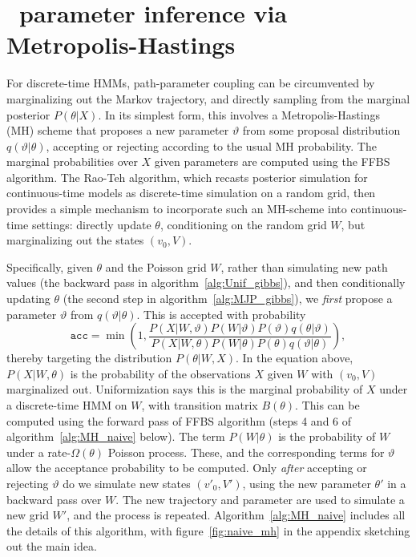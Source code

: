 \vspace{-.2in}
\section{\Naive\ parameter inference via Metropolis-Hastings}
For discrete-time HMMs, path-parameter coupling can be circumvented by marginalizing out the Markov trajectory, and directly sampling from the marginal posterior $P(\theta|X)$.
In its simplest form, this involves a Metropolis-Hastings (MH) scheme that proposes a new parameter $\vartheta$ from some proposal distribution $q(\vartheta|\theta)$, accepting or rejecting according to the usual MH probability.
The marginal probabilities over $X$ given parameters are computed using the FFBS algorithm.
The Rao-Teh algorithm, which recasts posterior simulation for continuous-time models as discrete-time simulation on a random grid, then provides a simple mechanism to incorporate such an MH-scheme into continuous-time settings: directly update $\theta$, conditioning on the random grid $W$, but marginalizing out the states $(v_0, V)$.

Specifically, given $\theta$ and the Poisson grid $W$, rather than simulating new path values (the backward pass in algorithm~\ref{alg:Unif_gibbs}), and then conditionally updating $\theta$ (the second step in algorithm~\ref{alg:MJP_gibbs}), we {\em first} propose a parameter $\vartheta$ from $q(\vartheta|\theta)$. This is accepted with probability 
$$ \texttt{acc} = \min\left(1, 
\frac{P(X|W,\vartheta) P(W|\vartheta)P(\vartheta)q(\theta|\vartheta)} {P(X|W,\theta) P(W|\theta)P(\theta)q(\vartheta|\theta)}\right),$$ 
thereby targeting the distribution $P(\theta|W,X)$.
In the equation above, $P(X|W,\theta)$ is the probability of the observations $X$ given $W$ with $(v_0,V)$ marginalized out. 
Uniformization says this is the marginal probability of $X$ under a discrete-time HMM on $W$, with transition matrix $B(\theta)$. This can be computed using the forward pass of FFBS algorithm (steps 4 and 6 of algorithm~\ref{alg:MH_naive} below). 
The term $P(W|\theta)$ is the probability of $W$ under a rate-$\Omega(\theta)$ Poisson process. 
These, and the corresponding terms for $\vartheta$ allow the acceptance probability to be computed.
Only {\em after} accepting or rejecting $\vartheta$ do we simulate new states $(v'_0,V')$, using the new parameter $\theta'$ in a backward pass over $W$. 
The new trajectory and parameter are used to simulate a new grid $W'$, and the process is repeated.
Algorithm~\ref{alg:MH_naive} includes all the details of this algorithm, with figure~\ref{fig:naive_mh} in the appendix sketching out the main idea.


